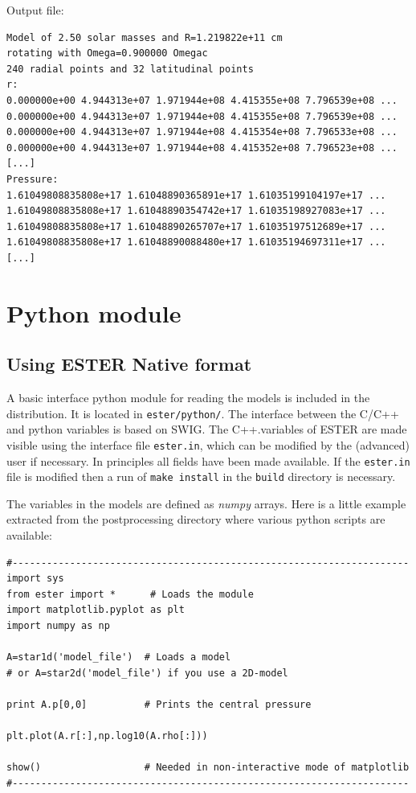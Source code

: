 Output file:
\begin{verbatim}
Model of 2.50 solar masses and R=1.219822e+11 cm
rotating with Omega=0.900000 Omegac
240 radial points and 32 latitudinal points
r:
0.000000e+00 4.944313e+07 1.971944e+08 4.415355e+08 7.796539e+08 ...
0.000000e+00 4.944313e+07 1.971944e+08 4.415355e+08 7.796539e+08 ...
0.000000e+00 4.944313e+07 1.971944e+08 4.415354e+08 7.796533e+08 ...
0.000000e+00 4.944313e+07 1.971944e+08 4.415352e+08 7.796523e+08 ...
[...]
Pressure:
1.61049808835808e+17 1.61048890365891e+17 1.61035199104197e+17 ...
1.61049808835808e+17 1.61048890354742e+17 1.61035198927083e+17 ...
1.61049808835808e+17 1.61048890265707e+17 1.61035197512689e+17 ...
1.61049808835808e+17 1.61048890088480e+17 1.61035194697311e+17 ...
[...]
\end{verbatim} 


\section{Python module}

\subsection{Using ESTER Native format}

A basic interface python module for reading the models is included in
the distribution. It is located in {\tt ester/python/}. The interface
between the C/C++ and python variables is based on SWIG. The C++.variables
of ESTER are made visible using the interface file \texttt{ester.in},
which can be modified by the (advanced) user if necessary. In principles
all fields have been made available. If the \texttt{ester.in} file
is modified then a run of \texttt{make install} in the \texttt{build}
directory is necessary.

The variables in the models are defined as \emph{numpy} arrays. Here is
a little example extracted from the postprocessing directory where various
python scripts are available:

\begin{verbatim}
#---------------------------------------------------------------------
import sys
from ester import *      # Loads the module
import matplotlib.pyplot as plt
import numpy as np

A=star1d('model_file')  # Loads a model 
# or A=star2d('model_file') if you use a 2D-model

print A.p[0,0]          # Prints the central pressure

plt.plot(A.r[:],np.log10(A.rho[:]))

show()                  # Needed in non-interactive mode of matplotlib
#---------------------------------------------------------------------
\end{verbatim}

